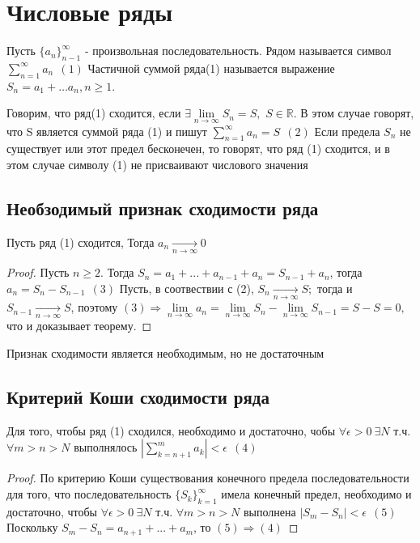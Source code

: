 \chapter{Числовые ряды}
\begin{definition}
Пусть $\{a_n\}_{n-1}^{\infty}$ - произвольная последовательность. Рядом называется символ $\sum_{n=1}^{\infty}{a_n} \ \ (1)$ Частичной суммой ряда(1) называется выражение $S_n = a_1+ \dots a_n, n\geq 1$.
\end{definition}
Говорим, что ряд(1) сходится, если $\exists \lim\limits_{n \to \infty}{S_n} = S,$ $S \in \mathbb{R}$. В этом случае говорят, что S является суммой ряда (1) и пишут $\sum_{n=1}^{\infty}{a_n} = S \ \ (2)$
Если предела $S_n$ не существует или этот предел бесконечен, то говорят, что ряд (1) сходится, и в этом случае символу (1) не присваивают числового значения
\section{ Необзодимый признак сходимости ряда}
\begin{theorem}
	Пусть ряд (1) сходится, Тогда $a_n \underset{n\to \infty}{\to}0$
\end{theorem}
\begin{proof}
	Пусть $n \geq 2$. Тогда $S_n = a_1 + ... + a_{n-1}+a_n = S_{n-1} +a_n$, тогда $a_n = S_n-S_{n-1} \ \ (3)$
	Пусть, в соотвествии с (2), $S_n \underset{n\to \infty}{\to} S;$ тогда и $S_{n-1} \underset{n\to \infty}{\to} S$, поэтому $(3) \Rightarrow \lim\limits_{n \to \infty}{a_n} = \lim\limits_{n \to \infty}{S_n} - \lim\limits_{n \to \infty}{S_{n-1}} = S - S = 0,$ что и доказывает теорему. 
\end{proof}
\begin{remark}
	Признак сходимости является необходимым, но не достаточным
\end{remark}
\section{Критерий Коши сходимости ряда}
\begin{theorem} Для того, чтобы ряд (1) сходился, необходимо и достаточно, чобы $\forall \epsilon > 0 \ \exists N$ т.ч. $\forall m> n> N$ выполнялось $|\sum_{k = n+1}^{m}{a_k}| < \epsilon \ \ (4)$
\end{theorem}
\begin{proof}
	По критерию Коши существования конечного предела последовательности для того, что последовательность $\{S_k\}_{k =1}^{\infty}$ имела конечный предел, необходимо и достаточно, чтобы $\forall \epsilon > 0 \ \exists N$ т.ч. $\forall m > n> N$ выполнена $|S_m - S_n| < \epsilon \ \ (5)$ Поскольку $S_m-S_n = a_{n+1}+...+a_m$, то $(5) \Rightarrow (4)$
\end{proof}
